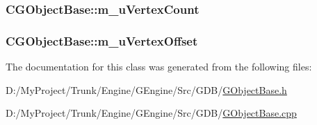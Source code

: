 \subsubsection[{m\+\_\+u\+Vertex\+Count}]{ C\+G\+Object\+Base\+::m\+\_\+u\+Vertex\+Count\hspace{0.3cm}{\ttfamily [protected]}}\label{class_c_g_object_base_a61308d916484b4580b648e8bcd5bf1fe}
\hypertarget{class_c_g_object_base_ad4d1be94d2905d252600c22af13707ea}{}
\subsubsection[{m\+\_\+u\+Vertex\+Offset}]{ C\+G\+Object\+Base\+::m\+\_\+u\+Vertex\+Offset\hspace{0.3cm}{\ttfamily [protected]}}\label{class_c_g_object_base_ad4d1be94d2905d252600c22af13707ea}


The documentation for this class was generated from the following files\+:\begin{DoxyCompactItemize}
\item 
D\+:/\+My\+Project/\+Trunk/\+Engine/\+G\+Engine/\+Src/\+G\+D\+B/\hyperlink{_g_object_base_8h}{G\+Object\+Base.\+h}\item 
D\+:/\+My\+Project/\+Trunk/\+Engine/\+G\+Engine/\+Src/\+G\+D\+B/\hyperlink{_g_object_base_8cpp}{G\+Object\+Base.\+cpp}\end{DoxyCompactItemize}
